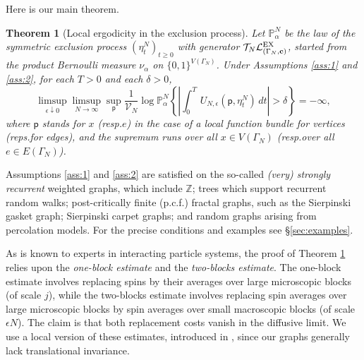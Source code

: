 \documentclass[11pt]{amsart}
\theoremstyle{plain}
\newtheorem{theorem}{Theorem}
\theoremstyle{definition}
\theoremstyle{remark}
\newcommand{\pt}{\mathsf{p}}
\begin{document}
Here is our main theorem.

\begin{theorem}[Local ergodicity in the exclusion process]
\label{thm:localrep}
Let $\mathbb{P}^N_{\alpha}$ be the law of the symmetric exclusion process $(\eta_t^N)_{t\geq 0}$ with generator $\mathcal{T}_N \mathcal{L}^{\rm EX}_{(\Gamma_N, {\bf c})}$, started from the product Bernoulli measure $\nu_\alpha$ on $\{0,1\}^{V(\Gamma_N)}$. Under Assumptions \ref{ass:1} and \ref{ass:2}, for each $T>0$ and each $\delta>0$,
\begin{equation}
\label{supexp}
\limsup_{\epsilon\downarrow 0} \limsup_{N\to\infty} \sup_{\pt} \frac{1}{\mathcal{V}_N} \log \mathbb{P}^N_{\alpha} \left\{ \left|\int_0^T\, U_{N,\epsilon}(\pt,\eta^N_t)\,dt\right|>\delta\right\} = -\infty,
\end{equation}
where $\pt$ stands for $x$ (resp.\@ $e$) in the case of a local function bundle for vertices (reps.\@ for edges), and the supremum runs over all $x\in V(\Gamma_N)$ (resp.\@ over all $e\in E(\Gamma_N)$).
\end{theorem}

Assumptions \ref{ass:1} and \ref{ass:2} are satisfied on the so-called \emph{(very) strongly recurrent} weighted graphs, which include $\mathbb{Z}$; trees which support recurrent random walks; post-critically finite (p.c.f.\@) fractal graphs, such as the Sierpinski gasket graph; Sierpinski carpet graphs; and random graphs arising from percolation models. For the precise conditions and examples see \S\ref{sec:examples}.

As is known to experts in interacting particle systems, the proof of Theorem \ref{thm:localrep} relies upon the \emph{one-block estimate} and the \emph{two-blocks estimate}. The one-block estimate involves replacing spins by their averages over large microscopic blocks (of scale $j$), while the two-blocks estimate involves replacing spin averages over large microscopic blocks by spin averages over small macroscopic blocks (of scale $\epsilon N$). The claim is that both replacement costs vanish in the diffusive limit. We use a local version of these estimates, introduced in \cite{JLSLocal}, since our graphs generally lack translational invariance.
\end{document}
